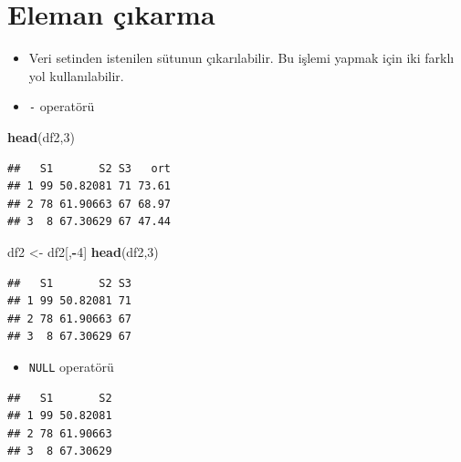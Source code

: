 \documentclass[
  oneside]{book}
\newenvironment{Shaded}{\begin{snugshade}}{\end{snugshade}}
\newcommand{\ConstantTok}[1]{\textcolor[rgb]{0.56,0.35,0.01}{#1}}
\newcommand{\DecValTok}[1]{\textcolor[rgb]{0.00,0.00,0.81}{#1}}
\newcommand{\FunctionTok}[1]{\textcolor[rgb]{0.13,0.29,0.53}{\textbf{#1}}}
\newcommand{\NormalTok}[1]{#1}
\newcommand{\OtherTok}[1]{\textcolor[rgb]{0.56,0.35,0.01}{#1}}
\newcommand{\SpecialCharTok}[1]{\textcolor[rgb]{0.81,0.36,0.00}{\textbf{#1}}}
\providecommand{\tightlist}{%
  \setlength{\itemsep}{0pt}\setlength{\parskip}{0pt}}
\begin{document}
\hypertarget{eleman-uxe7ux131karma}{%
\section{Eleman çıkarma}\label{eleman-uxe7ux131karma}}

\begin{itemize}
\item
  Veri setinden istenilen sütunun çıkarılabilir. Bu işlemi yapmak için iki farklı yol kullanılabilir.
\item
  \texttt{-} operatörü
\end{itemize}

\begin{Shaded}
\begin{Highlighting}[]
\FunctionTok{head}\NormalTok{(df2,}\DecValTok{3}\NormalTok{)}
\end{Highlighting}
\end{Shaded}

\begin{verbatim}
##   S1       S2 S3   ort
## 1 99 50.82081 71 73.61
## 2 78 61.90663 67 68.97
## 3  8 67.30629 67 47.44
\end{verbatim}

\begin{Shaded}
\begin{Highlighting}[]
\NormalTok{df2 }\OtherTok{\textless{}{-}}\NormalTok{ df2[,}\SpecialCharTok{{-}}\DecValTok{4}\NormalTok{] }
\FunctionTok{head}\NormalTok{(df2,}\DecValTok{3}\NormalTok{)}
\end{Highlighting}
\end{Shaded}

\begin{verbatim}
##   S1       S2 S3
## 1 99 50.82081 71
## 2 78 61.90663 67
## 3  8 67.30629 67
\end{verbatim}

\begin{itemize}
\tightlist
\item
  \texttt{NULL} operatörü
\end{itemize}

\begin{Shaded}
\end{Shaded}

\begin{verbatim}
##   S1       S2
## 1 99 50.82081
## 2 78 61.90663
## 3  8 67.30629
\end{verbatim}
\end{document}
